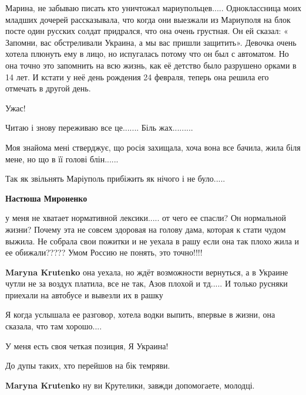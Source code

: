 
Марина, не забываю писать кто уничтожал мариупольцев..... Одноклассница моих
младших дочерей рассказывала, что когда они выезжали из Мариуполя на блок посте
один русских солдат придрался, что она очень грустная. Он ей сказал: «
Запомни, вас обстреливали Украина, а мы вас пришли защитить». Девочка очень хотела
плюнуть ему в лицо, но испугалась потому что он был с автоматом. Но она точно это
запомнить на всю жизнь, как её детство было разрушено орками в 14 лет. И кстати
у неё день рождения 24 февраля, теперь она решила его отмечать в другой день.


Ужас!


Читаю і знову переживаю все це....... Біль жах.........


Моя знайома мені стверджує, що росія захищала, хоча вона все бачила, жила біля
мене, но що в її голові блін......

Так як звільнять Маріуполь прибіжить як нічого і не було.....

\begin{itemize} %
\textbf{Настюша Мироненко} 

у меня не хватает нормативной лексики..... от чего ее спасли? Он нормальной
жизни? Почему эта не совсем здоровая на голову дама, которая к стати чудом
выжила. Не собрала свои пожитки и не уехала в рашу если она так плохо жила и ее
обижали????? Умом Россию не понять, это точно!!!!

\textbf{Maryna Krutenko} она уехала, но ждёт возможности вернуться, а в Украине чутли не за воздух платила, все не так, Азов плохой и тд..... И только русняки приехали на автобусе и вывезли их в рашку


Я когда услышала ее разговор, хотела водки выпить, впервые в жизни, она сказала, что там хорошо....


У меня есть своя четкая позиция, Я Украина!

До дупы таких, хто перейшов на бік темряви.

\textbf{Maryna Krutenko} ну ви Крутелики, завжди допомогаете, молодці.
\end{itemize} %

